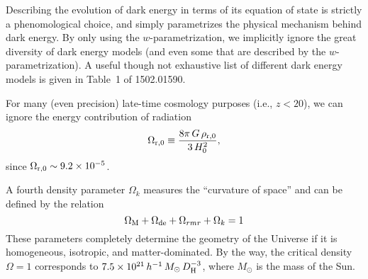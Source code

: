\documentclass[modern]{aastex62}
\begin{document}
Describing the evolution of dark energy in terms of its equation of state is
strictly a phenomological choice, and simply parametrizes the physical
mechanism behind dark energy. By only using the $w$-parametrization, we
implicitly ignore the great diversity of dark energy models (and even some
that are described by the $w$-parametrization). A useful though not exhaustive
list of different dark energy models is given in Table~1 of 1502.01590.

For many (even precision) late-time cosmology purposes (i.e., $z<20$), we can
ignore the energy contribution of radiation
\begin{equation}
\Omega_{{\rm r}, 0}\equiv\frac{8\pi\,G\,\rho_{{\rm r}, 0}}{3\,H_0^2}\text{,}
\end{equation}
since $\Omega_{{\rm r}, 0} \sim 9.2\times10^{-5}$.

A fourth density parameter $\Omega_k$ measures the ``curvature of space'' and
can be defined by the relation
\begin{equation}
\Omega_{\rm M}+\Omega_{\rm de}+ \Omega_{rm r} + \Omega_k= 1
\end{equation}
These parameters completely determine the geometry of the Universe if it is
homogeneous, isotropic, and matter-dominated.  By the way, the critical
density $\Omega=1$ corresponds to $7.5\times
10^{21}\,h^{-1}\,M_{\odot}\,D_{\rm H}^{-3}$, where $M_{\odot}$ is the mass of
the Sun.
\end{document}
